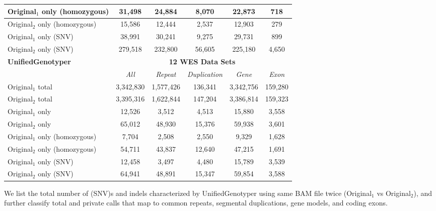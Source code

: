 {\begin{table}[htb]
\begin{center}
\begin{tabular}{|l|c||c|c|c|c|}
\hline
Original$_1$ only (homozygous) & 31,498 & 24,884 & 8,070 & 22,873 & 718 \\
\hline
Original$_2$ only (homozygous) & 15,586 & 12,444 & 2,537 & 12,903 & 279 \\
\hline
Original$_1$ only (SNV) & 38,991 & 30,241 & 9,275 & 29,731 & 899 \\
\hline
Original$_2$ only (SNV) & 279,518 & 232,800 & 56,605 & 225,180 & 4,650 \\
\hline
\hline
{\bf UnifiedGenotyper} & \multicolumn{5}{|c|}{\bf 12 WES Data Sets} \\
\hline
\cline{2-6}
{\bf} & {\it All} & {\it Repeat} & {\it Duplication} & {\it Gene} & {\it Exon} \\
\hline
Original$_1$ total & 3,342,830 & 1,577,426 & 136,341 & 3,342,756 & 159,280 \\
\hline
Original$_2$ total & 3,395,316 & 1,622,844 & 147,204 & 3,386,814 & 159,323 \\
\hline
Original$_1$ only & 12,526 & 3,512 & 4,513 & 15,880 & 3,558 \\
\hline
Original$_2$ only & 65,012 & 48,930 & 15,376 & 59,938 & 3,601 \\
\hline
Original$_1$ only (homozygous) & 7,704 & 2,508 & 2,550 & 9,329 & 1,628 \\
\hline
Original$_2$ only (homozygous) & 54,711 & 43,837 & 12,640 & 47,215 & 1,691 \\
\hline
Original$_1$ only (SNV) & 12,458 & 3,497 & 4,480 & 15,789 & 3,539 \\
\hline
Original$_2$ only (SNV) & 64,941 & 48,891 & 15,347 & 59,854 & 3,588 \\
\hline
\end{tabular}
\end{center}
{\footnotesize We list the total number of (SNV)s and indels characterized by UnifiedGenotyper using same BAM file twice (Original$_1$ vs Original$_2$), 
and further classify total and private calls that map to common repeats, segmental duplications, gene models, and coding exons.}
\label{supptab:orig-vs-orig2-ug}
\end{table}

}



